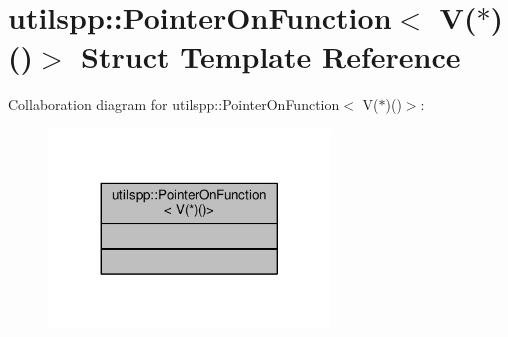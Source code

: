 \hypertarget{structutilspp_1_1PointerOnFunction_3_01V_07_5_08_07_08_4}{\section{utilspp\-:\-:Pointer\-On\-Function$<$ V($\ast$)()$>$ Struct Template Reference}
\label{structutilspp_1_1PointerOnFunction_3_01V_07_5_08_07_08_4}
}


Collaboration diagram for utilspp\-:\-:Pointer\-On\-Function$<$ V($\ast$)()$>$\-:
\nopagebreak
\begin{figure}[H]
\begin{center}
\leavevmode
\includegraphics[width=212pt]{structutilspp_1_1PointerOnFunction_3_01V_07_5_08_07_08_4__coll__graph}
\end{center}
\end{figure}
